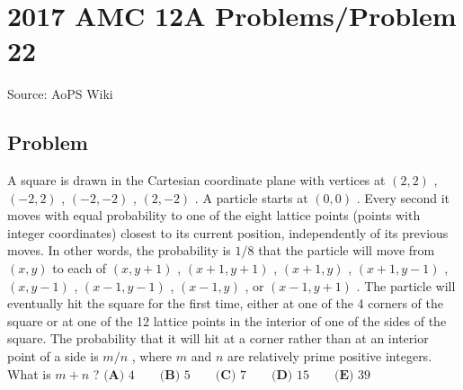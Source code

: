 \documentclass[12pt]{article}
\begin{document}
\section*{{2017 AMC 12A Problems/Problem 22}}
Source: AoPS Wiki

\subsection*{Problem}
A square is drawn in the Cartesian coordinate plane with vertices at $(2, 2)$ , $(-2, 2)$ , $(-2, -2)$ , $(2, -2)$ . A particle starts at $(0,0)$ . Every second it moves with equal probability to one of the eight lattice points (points with integer coordinates) closest to its current position, independently of its previous moves. In other words, the probability is $1/8$ that the particle will move from $(x, y)$ to each of $(x, y + 1)$ , $(x + 1, y + 1)$ , $(x + 1, y)$ , $(x + 1, y - 1)$ , $(x, y - 1)$ , $(x - 1, y - 1)$ , $(x - 1, y)$ , or $(x - 1, y + 1)$ . The particle will eventually hit the square for the first time, either at one of the 4 corners of the square or at one of the 12 lattice points in the interior of one of the sides of the square. The probability that it will hit at a corner rather than at an interior point of a side is $m/n$ , where $m$ and $n$ are relatively prime positive integers. What is $m + n$ ? $\textbf{(A) } 4 \qquad\textbf{(B) } 5 \qquad\textbf{(C) } 7 \qquad\textbf{(D) } 15 \qquad\textbf{(E) } 39$
\end{document}
